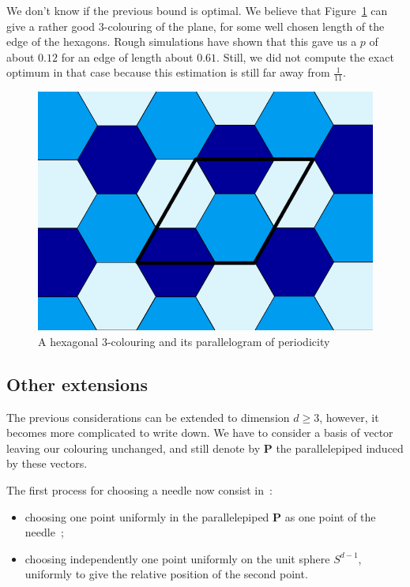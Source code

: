 \documentclass[a4paper,11pt]{article}
\theoremstyle{definition}
\theoremstyle{remark}
\begin{document}
We don't know if the previous bound is optimal. We believe that Figure~\ref{trois} 
can give a rather good $3$-colouring of the plane, for some well chosen length 
of the edge of the hexagons. Rough simulations have shown that this gave us a 
$p$ of about $0.12$ for an edge of length about $0.61$. 
Still, we did not compute the exact optimum in that case because this 
estimation is still far away from $\frac{1}{11}$.

\begin{figure}[h]
\center
\includegraphics[scale=0.5]{trois.png}
\caption{\label{trois} A hexagonal $3$-colouring and its parallelogram of periodicity}
\end{figure}

\subsection{Other extensions}
\label{dim}

The previous considerations can be extended to dimension $d \geq 3$, however, 
it becomes more complicated to write down. We have to consider a basis of 
vector leaving our colouring unchanged, and still denote by $\mathbf{P}$ the 
parallelepiped induced by these vectors.

The first process for choosing a needle now consist in~: 
\begin{itemize}
	\item choosing one point uniformly in the parallelepiped $ \mathbf{P} $ as 
	one point of the needle~;
	\item choosing independently one point uniformly on the unit sphere 
	$S^{d-1}$, uniformly to give the relative position of the second point.
\end{itemize}
\end{document}
